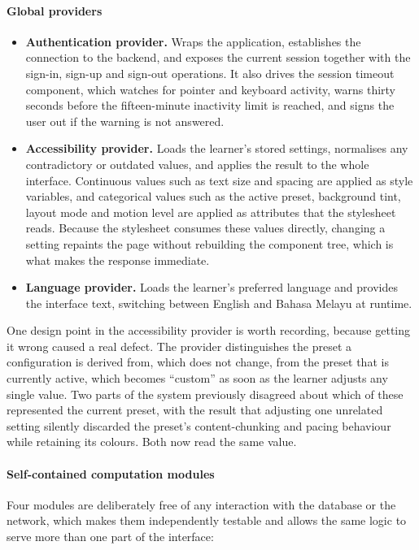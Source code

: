 \documentclass[12pt, oneside]{article} %
\begin{document}
\paragraph{Global providers}

\begin{itemize}
    \item \textbf{Authentication provider.} Wraps the application, establishes the connection to the backend, and exposes the current session together with the sign-in, sign-up and sign-out operations. It also drives the session timeout component, which watches for pointer and keyboard activity, warns thirty seconds before the fifteen-minute inactivity limit is reached, and signs the user out if the warning is not answered.
    \item \textbf{Accessibility provider.} Loads the learner's stored settings, normalises any contradictory or outdated values, and applies the result to the whole interface. Continuous values such as text size and spacing are applied as style variables, and categorical values such as the active preset, background tint, layout mode and motion level are applied as attributes that the stylesheet reads. Because the stylesheet consumes these values directly, changing a setting repaints the page without rebuilding the component tree, which is what makes the response immediate.
    \item \textbf{Language provider.} Loads the learner's preferred language and provides the interface text, switching between English and Bahasa Melayu at runtime.
\end{itemize}

One design point in the accessibility provider is worth recording, because getting it wrong caused a real defect. The provider distinguishes the preset a configuration is derived from, which does not change, from the preset that is currently active, which becomes ``custom'' as soon as the learner adjusts any single value. Two parts of the system previously disagreed about which of these represented the current preset, with the result that adjusting one unrelated setting silently discarded the preset's content-chunking and pacing behaviour while retaining its colours. Both now read the same value.

\paragraph{Self-contained computation modules}

Four modules are deliberately free of any interaction with the database or the network, which makes them independently testable and allows the same logic to serve more than one part of the interface:
\end{document}

